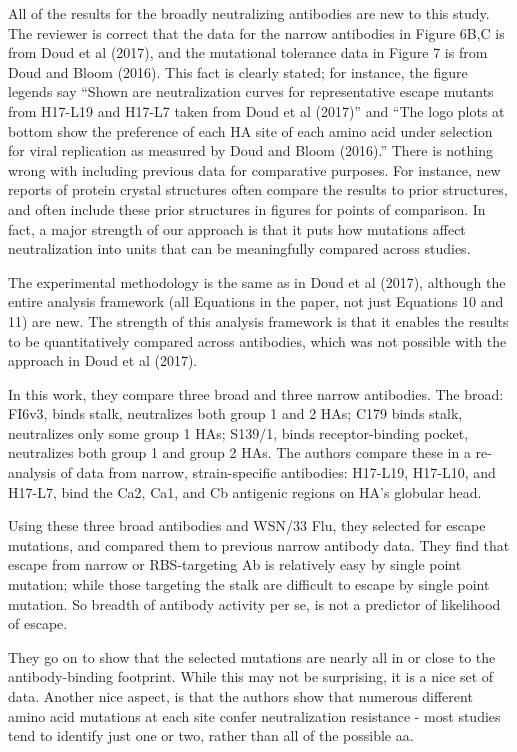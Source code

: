 \documentclass[11pt, oneside]{article}   	%
\begin{document}
{\color{black}
All of the results for the broadly neutralizing antibodies are new to this study.
The reviewer is correct that the data for the narrow antibodies in Figure 6B,C is from Doud et al (2017), and the mutational tolerance data in Figure 7 is from Doud and Bloom (2016).
This fact is clearly stated; for instance, the figure legends say ``Shown are neutralization curves for representative escape mutants from H17-L19 and H17-L7 taken from Doud et al (2017)'' and ``The logo plots at bottom show the preference of each HA site of each amino acid under selection for viral replication as measured by Doud and Bloom (2016).''
There is nothing wrong with including previous data for comparative purposes.
For instance, new reports of protein crystal structures often compare the results to prior structures, and often include these prior structures in figures for points of comparison.
In fact, a major strength of our approach is that it puts how mutations affect neutralization into units that can be meaningfully compared across studies.

The experimental methodology is the same as in Doud et al (2017), although the entire analysis framework (all Equations in the paper, not just Equations 10 and 11) are new.
The strength of this analysis framework is that it enables the results to be quantitatively compared across antibodies, which was not possible with the approach in Doud et al (2017). 
}

In this work, they compare three broad and three narrow antibodies. The broad: FI6v3, binds stalk, neutralizes both group 1 and 2 HAs; C179 binds stalk, neutralizes only some group 1 HAs; S139/1, binds receptor-binding pocket, neutralizes both group 1 and group 2 HAs. The authors compare these in a re-analysis of data from narrow, strain-specific antibodies: H17-L19, H17-L10, and H17-L7, bind the Ca2, Ca1, and Cb antigenic regions on HA's globular head.

Using these three broad antibodies and WSN/33 Flu, they selected for escape mutations, and compared them to previous narrow antibody data. They find that escape from narrow or RBS-targeting Ab is relatively easy by single point mutation; while those targeting the stalk are difficult to escape by single point mutation. So breadth of antibody activity per se, is not a predictor of likelihood of escape.

They go on to show that the selected mutations are nearly all in or close to the antibody-binding footprint. While this may not be surprising, it is a nice set of data. Another nice aspect, is that the authors show that numerous different amino acid mutations at each site confer neutralization resistance - most studies tend to identify just one or two, rather than all of the possible aa.
\end{document}
